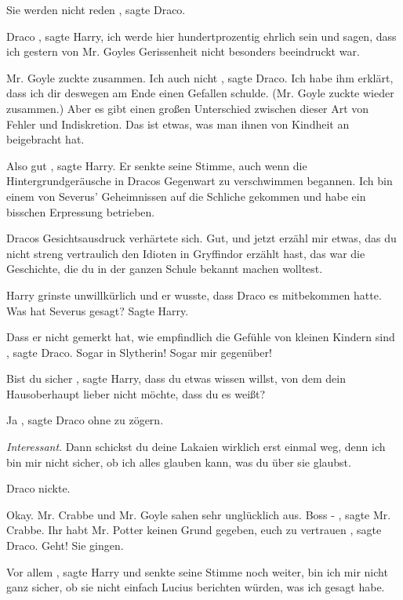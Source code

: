 \glqq Sie werden nicht reden\grqq{} , sagte Draco.

\glqq Draco\grqq{} , sagte Harry, \glqq ich werde hier hundertprozentig ehrlich
sein und sagen, dass ich gestern von Mr. Goyles Gerissenheit nicht besonders
beeindruckt war.\grqq{}

Mr. Goyle zuckte zusammen. \glqq Ich auch nicht\grqq{} , sagte Draco. \glqq Ich
habe ihm erklärt, dass ich dir deswegen am Ende einen Gefallen schulde.\grqq{}
(Mr. Goyle zuckte wieder zusammen.) \glqq Aber es gibt einen großen Unterschied
zwischen dieser Art von Fehler und Indiskretion. Das ist etwas, was man ihnen
von Kindheit an beigebracht hat.\grqq{}

\glqq Also gut\grqq{} , sagte Harry. Er senkte seine Stimme, auch wenn die
Hintergrundgeräusche in Dracos Gegenwart zu verschwimmen begannen. \glqq Ich bin
einem von Severus' Geheimnissen auf die Schliche gekommen und habe ein bisschen
Erpressung betrieben.\grqq{}

Dracos Gesichtsausdruck verhärtete sich. \glqq Gut, und jetzt erzähl mir etwas,
das du nicht streng vertraulich den Idioten in Gryffindor erzählt hast, das war
die Geschichte, die du in der ganzen Schule bekannt machen wolltest.\grqq{}

Harry grinste unwillkürlich und er wusste, dass Draco es mitbekommen hatte.
\glqq Was hat Severus gesagt?\grqq{} Sagte Harry.

\glqq Dass er nicht gemerkt hat, wie empfindlich die Gefühle von kleinen Kindern
sind\grqq{} , sagte Draco. \glqq Sogar in Slytherin! Sogar mir gegenüber!\grqq{}

\glqq Bist du sicher\grqq{} , sagte Harry, \glqq dass du etwas wissen willst,
von dem dein Hausoberhaupt lieber nicht möchte, dass du es weißt?\grqq{}

\glqq Ja\grqq{} , sagte Draco ohne zu zögern.

\emph{Interessant}. \glqq Dann schickst du deine Lakaien wirklich erst einmal
weg, denn ich bin mir nicht sicher, ob ich alles glauben kann, was du über sie
glaubst.\grqq{}

Draco nickte.

\glqq Okay.\grqq{} Mr. Crabbe und Mr. Goyle sahen sehr unglücklich aus. \glqq
Boss -\grqq{} , sagte Mr. Crabbe. \glqq Ihr habt Mr. Potter keinen Grund
gegeben, euch zu vertrauen\grqq{} , sagte Draco. \glqq Geht!\grqq{} Sie gingen.

\glqq Vor allem\grqq{} , sagte Harry und senkte seine Stimme noch weiter, \glqq
bin ich mir nicht ganz sicher, ob sie nicht einfach Lucius berichten würden, was
ich gesagt habe.\grqq{}

